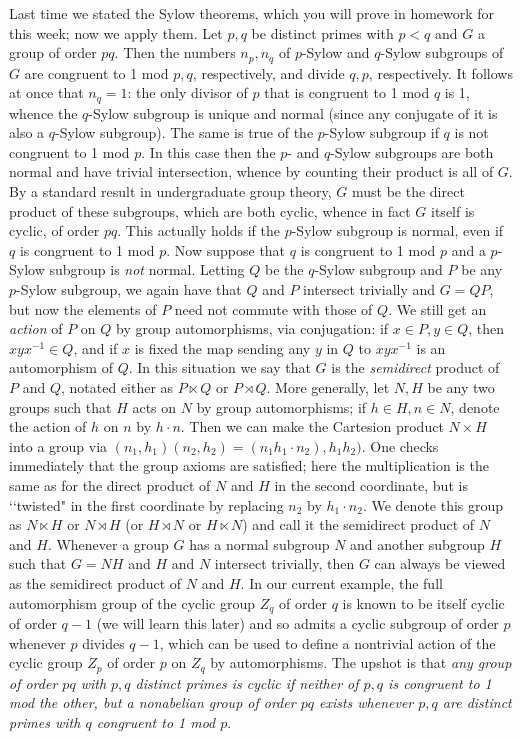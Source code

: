 Last time we stated the Sylow theorems, which you will prove in homework for this week; now we apply them.  Let $p,q$ be distinct primes with $p<q$ and $G$ a group of order $pq$.  Then the numbers $n_p,n_q$ of $p$-Sylow and $q$-Sylow subgroups of $G$ are congruent to 1 mod $p,q$, respectively, and divide $q,p$, respectively.  It follows at once that $n_q = 1$:  the only divisor of $p$ that is congruent to 1 mod $q$ is 1, whence the $q$-Sylow subgroup is unique and normal (since any conjugate of it is also a $q$-Sylow subgroup).  The same is true of the $p$-Sylow subgroup if $q$ is not congruent to 1 mod $p$.  In this case then the $p$- and $q$-Sylow subgroups are both normal and have trivial intersection, whence by counting their product is all of $G$.  By a standard result in undergraduate group theory, $G$ must be the direct product of these subgroups, which are both cyclic, whence in fact $G$ itself is cyclic, of order $pq$.  This actually holds if the $p$-Sylow subgroup is normal, even if $q$ is congruent to 1 mod $p$.  Now suppose that $q$ is congruent to 1 mod $p$ and a $p$-Sylow subgroup is {\sl not} normal.  Letting $Q$ be the $q$-Sylow subgroup and $P$ be any $p$-Sylow subgroup, we again have that $Q$ and $P$ intersect trivially and $G = QP$, but now the elements of $P$ need not commute with those of $Q$.  We still get an {\sl action} of $P$ on $Q$ by group automorphisms, via conjugation:  if $x\in P,y\in Q$, then $xyx^{-1}\in Q$, and if $x$ is fixed the map sending any $y$ in $Q$ to $xyx^{-1}$ is an automorphism of $Q$.  In this situation we say that $G$ is the {\sl semidirect} product of $P$ and $Q$, notated either as $P\ltimes Q$ or $P\rtimes Q$.  More generally, let $N,H$ be any two groups such that $H$ acts on $N$ by group automorphisms; if $h\in H,n\in N$, denote the action of $h$ on $n$ by $h\cdot n$.  Then we can make the Cartesion product $N\times H$ into a group via $(n_1,h_1) (n_2,h_2) = (n_1 h_1\cdot n_2),h_1 h_2)$.  One checks immediately that the group axioms are satisfied; here the multiplication is the same as for the direct product of $N$ and $H$ in the second coordinate, but is \lq\lq twisted" in the first coordinate by replacing $n_2$ by $h_1\cdot n_2$.  We denote this group as $N\ltimes H$ or $N\rtimes H$ (or
$H\rtimes N$ or $H\ltimes N$) and call it the semidirect product of $N$ and $H$.  Whenever a group $G$ has a normal subgroup $N$ and another subgroup $H$ such that $G = NH$ and $H$ and $N$ intersect trivially, then $G$ can always be viewed as the semidirect product of $N$ and $H$.  In our current example, the full automorphism group of the cyclic group $Z_q$ of order $q$ is known to be itself cyclic of order $q-1$ (we will learn this later) and so admits a cyclic subgroup of order $p$ whenever $p$ divides $q-1$, which can be used to define a nontrivial action of the cyclic group $Z_p$ of order $p$ on $Z_q$ by automorphisms.  The upshot is that {\sl any group of order $pq$ with $p,q$ distinct primes is cyclic if neither of $p,q$ is congruent to 1 mod the other, but a nonabelian group of order $pq$ exists whenever $p,q$ are distinct primes with $q$ congruent to 1 mod $p$}.  

